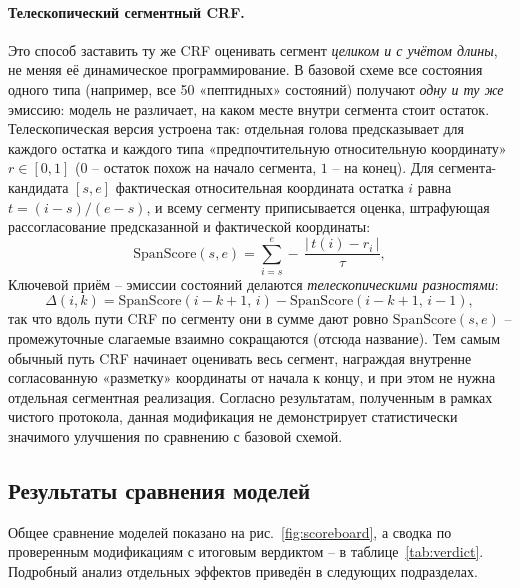 \documentclass{article}
\begin{document}
\paragraph{Телескопический сегментный CRF.} Это способ заставить ту же CRF оценивать сегмент \emph{целиком и с учётом длины}, не меняя её динамическое программирование. В базовой схеме все состояния одного типа (например, все 50 «пептидных» состояний) получают \emph{одну и ту же} эмиссию: модель не различает, на каком месте внутри сегмента стоит остаток. Телескопическая версия устроена так: отдельная голова предсказывает для каждого остатка и каждого типа «предпочтительную относительную координату» $r\in[0,1]$ ($0$ -- остаток похож на начало сегмента, $1$ -- на конец). Для сегмента-кандидата $[s,e]$ фактическая относительная координата остатка $i$ равна $t=(i-s)/(e-s)$, и всему сегменту приписывается оценка, штрафующая рассогласование предсказанной и фактической координаты:
$$\mathrm{SpanScore}(s,e)=\sum_{i=s}^{e} -\,\frac{|\,t(i)-r_i\,|}{\tau},$$
Ключевой приём -- эмиссии состояний делаются \emph{телескопическими разностями}:
$$\Delta(i,k)=\mathrm{SpanScore}(i-k+1,\,i)-\mathrm{SpanScore}(i-k+1,\,i-1),$$
так что вдоль пути CRF по сегменту они в сумме дают ровно $\mathrm{SpanScore}(s,e)$ -- промежуточные слагаемые взаимно сокращаются (отсюда название). Тем самым обычный путь CRF начинает оценивать весь сегмент, награждая внутренне согласованную «разметку» координаты от начала к концу, и при этом не нужна отдельная сегментная реализация. Согласно результатам, полученным в рамках чистого протокола, данная модификация не демонстрирует статистически значимого улучшения по сравнению с базовой схемой.

\subsection{Результаты сравнения моделей}\label{sec:results}
Общее сравнение моделей показано на рис.~\ref{fig:scoreboard}, а сводка по проверенным модификациям с итоговым вердиктом -- в таблице~\ref{tab:verdict}. Подробный анализ отдельных эффектов приведён в следующих подразделах.
\end{document}
